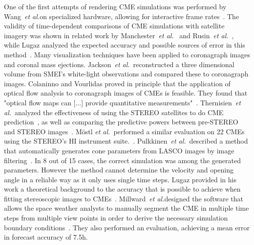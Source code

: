 \documentclass[journal]{vgtc}                %
\def\etal{\textit{et al.}}
\def\etal{\textit{et al.}}
\begin{document}
 One of the first attempts of rendering CME simulations was performed by Wang~\etal on specialized hardware, allowing for interactive frame rates~\cite{wang2004visualization}. The validity of time-dependent comparisons of CME simulations with satellite imagery was shown in related work by Manchester~\etal ~\cite{manchester2008three} and Rusin~\etal ~\cite{rusin2010comparing}, while Lugaz analyzed the expected accuracy and possible sources of error in this method~\cite{lugaz2010accuracy}. Many visualization techniques have been applied to coronagraph images and coronal mass ejections. Jackson~\etal\ reconstructed a three dimensional volume from SMEI's white-light observations and compared these to coronagraph images. Colaninno and Vourlidas proved in principle that the application of optical flow analysis to coronagraph images of CMEs is feasible. They found that "optical flow maps can [...] provide quantitative measurements"~\cite{Colaninno:2006ef}. Thernisien~\etal\ analyzed the effectiveness of using the STEREO satellites to do CME prediction~\cite{Thernisien:2009hx}, as well as comparing the predictive powers between pre-STEREO and STEREO images~\cite{Thernisien:2011fl}. M\"ostl \etal\ performed a similar evaluation on 22 CMEs using the STEREO's HI instrument suite.~\cite{Mostl:2014iv}. Pulkkinen~\etal\ described a method that automatically generates cone parameters from LASCO images by image filtering~\cite{Pulkkinen:2009gb}. In 8 out of 15 cases, the correct simulation was among the generated parameters. However the method cannot determine the velocity and opening angle in a reliable way as it only uses single time steps. Lugaz provided in his work a theoretical background to the accuracy that is possible to achieve when fitting stereoscopic images to CMEs~\cite{Lugaz:2010dx}. Millward~\etal designed the software that allows the space weather analysts to manually segment the CME in multiple time steps from multiple view points in order to derive the necessary simulation boundary conditions~\cite{Millward:2013cm}. They also performed an evaluation, achieving a mean error in forecast accuracy of 7.5h.
\end{document}
